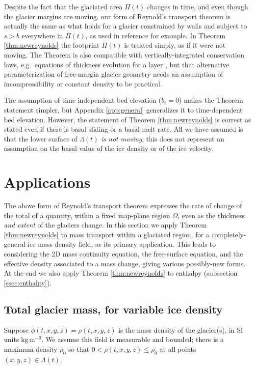 \documentclass[11pt]{amsart}
\theoremstyle{definition}
\begin{document}
Despite the fact that the glaciated area $\Pi(t)$ changes in time, and even though the glacier margins are moving, our form of Reynold's transport theorem is actually the same as what holds for a glacier constrained by walls and subject to $s>b$ everywhere in $\Pi(t)$, as used in reference \cite{LofgrenAhlkronaHelanow2022} for example.  In Theorem \ref{thm:newreynolds} the footprint $\Pi(t)$ is treated simply, as if it were not moving.  The Theorem is also compatible with vertically-integrated conservation laws, e.g.~equations of thickness evolution for a layer \cite{Bueler2021conservation}, but that alternative parameterization of free-margin glacier geometry needs an assumption of incompressibility or constant density to be practical.

The assumption of time-independent bed elevation ($b_t=0$) makes the Theorem statement simpler, but Appendix \ref{app:general} generalizes it to time-dependent bed elevation.  However, the statement of Theorem \ref{thm:newreynolds} is correct as stated even if there is basal sliding or a basal melt rate.  All we have assumed is that the lower surface of $\Lambda(t)$ \emph{is not moving}; this does not represent an assumption on the basal value of the ice density or of the ice velocity.


\section{Applications}  \label{sec:apps}

The above form of Reynold's transport theorem expresses the rate of change of the total of a quantity, within a fixed map-plane region $\Omega$, even as the thickness \emph{and extent} of the glaciers change.  In this section we apply Theorem \ref{thm:newreynolds} to mass transport within a glaciated region, for a completely-general ice mass density field, as its primary application.  This leads to considering the 2D mass continuity equation, the free-surface equation, and the effective density associated to a mass change, giving various possibly-new forms.  At the end we also apply Theorem \ref{thm:newreynolds} to enthalpy (subsection \ref{ssec:enthalpy}).

\subsection{Total glacier mass, for variable ice density}  \label{ssec:mass} Suppose $\phi(t,x,y,z)=\rho(t,x,y,z)$ is the mass density of the glacier(s), in SI units $\text{kg}\,\text{m}^{-3}$.  We assume this field is measurable and bounded; there is a maximum density $\rho_0$ so that $0 < \rho(t,x,y,z) \le \rho_0$ at all points $(x,y,z) \in \Lambda(t)$.
\end{document}
